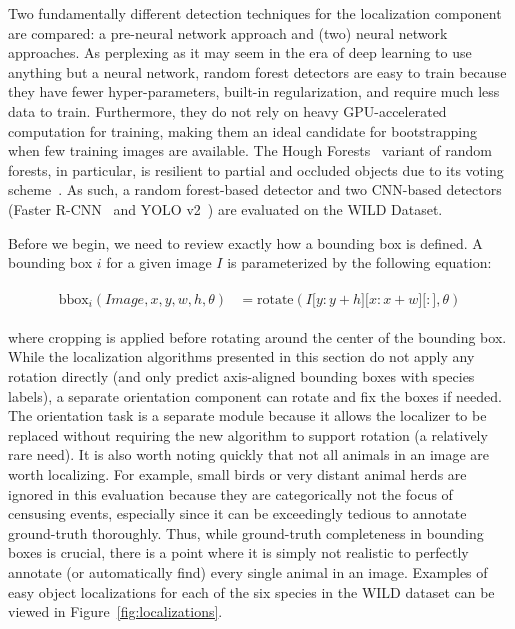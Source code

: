 Two fundamentally different detection techniques for the localization component are compared: a pre-neural network approach and (two) neural network approaches.  As perplexing as it may seem in the era of deep learning to use anything but a neural network, random forest detectors are easy to train because they have fewer hyper-parameters, built-in regularization, and require much less data to train.  Furthermore, they do not rely on heavy GPU-accelerated computation for training, making them an ideal candidate for bootstrapping when few training images are available.  The Hough Forests~\cite{gall_class-specific_2009} variant of random forests, in particular, is resilient to partial and occluded objects due to its voting scheme~\cite{winn_layout_2006}.  As such, a random forest-based detector and two CNN-based detectors (Faster R-CNN~\cite{ren_faster_2015} and YOLO v2~\cite{redmon_yolo9000:_2016}) are evaluated on the WILD Dataset.

Before we begin, we need to review exactly how a bounding box is defined.  A bounding box $i$ for a given image $I$ is parameterized by the following equation:

\begin{align}
    \begin{split}
        \text{bbox}_{i}(Image, x, y, w, h, \theta) &= \text{rotate}(I \lbrack y: y + h \rbrack \lbrack x: x + w \rbrack \lbrack:\rbrack, \theta)
    \end{split}
\end{align}

\noindent where cropping is applied before rotating around the center of the bounding box.  While the localization algorithms presented in this section do not apply any rotation directly (and only predict axis-aligned bounding boxes with species labels), a separate orientation component can rotate and fix the boxes if needed.  The orientation task is a separate module because it allows the localizer to be replaced without requiring the new algorithm to support rotation (a relatively rare need).  It is also worth noting quickly that not all animals in an image are worth localizing.  For example, small birds or very distant animal herds are ignored in this evaluation because they are categorically not the focus of censusing events, especially since it can be exceedingly tedious to annotate ground-truth thoroughly. Thus, while ground-truth completeness in bounding boxes is crucial, there is a point where it is simply not realistic to perfectly annotate (or automatically find) every single animal in an image.
Examples of easy object localizations for each of the six species in the WILD dataset can be viewed in Figure~\ref{fig:localizations}.

